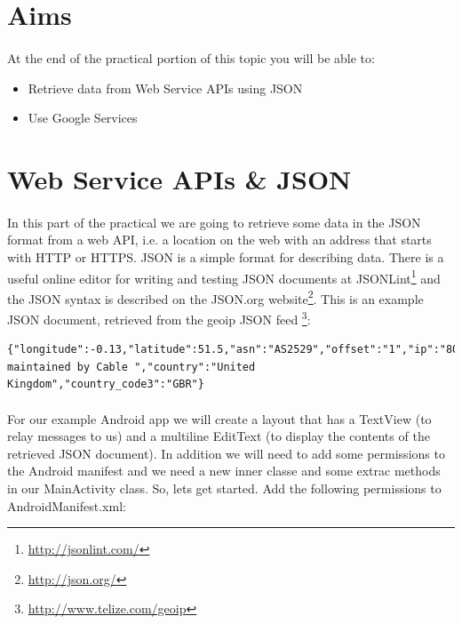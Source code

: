 \section{Aims}
\paragraph{} At the end of the practical portion of this topic you will be able to:

\begin{itemize}
\item Retrieve data from Web Service APIs using JSON
\item Use Google Services
\end{itemize}

\section{Web Service APIs \& JSON}
\paragraph{} In this part of the practical we are going to retrieve some data in the JSON format from a web API, i.e. a location on the web with an address that starts with HTTP or HTTPS. JSON is a simple format for describing data. There is a useful online editor for writing and testing JSON documents at JSONLint\footnote{\url{http://jsonlint.com/}} and the JSON syntax is described on the JSON.org website\footnote{\url{http://json.org/}}. This is an example JSON document, retrieved from the geoip JSON feed \footnote{\url{http://www.telize.com/geoip}}:

\begin{lstlisting}
{"longitude":-0.13,"latitude":51.5,"asn":"AS2529","offset":"1","ip":"80.176.131.121","area_code":"0","continent_code":"EU","dma_code":"0","timezone":"Europe\/London","country_code":"GB","isp":"Now maintained by Cable ","country":"United Kingdom","country_code3":"GBR"}
\end{lstlisting}

\paragraph{} For our example Android app we will create a layout that has a TextView (to relay messages to us) and a multiline EditText (to display the contents of the retrieved JSON document). In addition we will need to add some permissions to the Android manifest and we need a new inner classe and some extrac methods in our MainActivity class. So, lets get started. Add the following permissions to AndroidManifest.xml:

